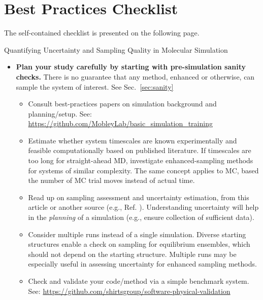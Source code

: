 \section{Best Practices Checklist}

The self-contained checklist is presented on the following page.

\begin{Checklists*}[p!]
\begin{checklist}{Quantifying Uncertainty and Sampling Quality in Molecular Simulation}
\begin{itemize}
\item
  \textbf{Plan your study carefully by starting with pre-simulation sanity checks.}
  There is no guarantee that any method, enhanced or otherwise, can sample the system of interest.
  See Sec.\ \ref{sec:sanity}
    \begin{itemize}
    \item Consult best-practices papers on simulation background and planning/setup.
      See: \url{https://github.com/MobleyLab/basic_simulation_training}
    \item Estimate whether system timescales are known experimentally and feasible computationally based on published literature.
      If timescales are too long for straight-ahead MD, investigate enhanced-sampling methods for systems of similar complexity.
      The same concept applies to MC, based the number of MC trial moves instead of actual time.
    \item Read up on sampling assessment and uncertainty estimation, from this article or another source (e.g., Ref. \cite{Grossfield2009}).
      Understanding uncertainty will help in the \emph{planning} of a simulation (e.g., ensure collection of sufficient data).
    \item Consider multiple runs instead of a single simulation.
      Diverse starting structures enable a check on sampling for equilibrium ensembles, which should not depend on the starting structure.
      Multiple runs may be especially useful in assessing uncertainty for enhanced sampling methods.
    \item Check and validate your code/method via a simple benchmark system.
      See: \url{https://github.com/shirtsgroup/software-physical-validation}
    \end{itemize}
    \vspace{-0.325\baselineskip} %
    

\end{itemize}
\end{checklist}
\end{Checklists*}
